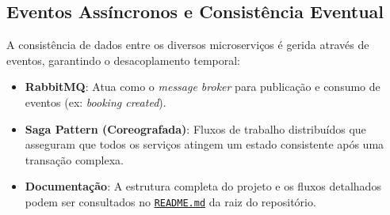\medskip

\subsection{Eventos Assíncronos e Consistência Eventual}
A consistência de dados entre os diversos microserviços é gerida através de eventos, garantindo o desacoplamento temporal:

\begin{itemize}[itemsep=0.4em]
  \item \textbf{RabbitMQ}: Atua como o \textit{message broker} para publicação e consumo de eventos (ex: \textit{booking created}).
  \item \textbf{Saga Pattern (Coreografada)}: Fluxos de trabalho distribuídos que asseguram que todos os serviços atingem um estado consistente após uma transação complexa.
  \item \textbf{Documentação}: A estrutura completa do projeto e os fluxos detalhados podem ser consultados no \href{https://github.com/kanekitakitos/Nexus-Estates/blob/main/README.md}{\texttt{README.md}} da raiz do repositório.
\end{itemize}